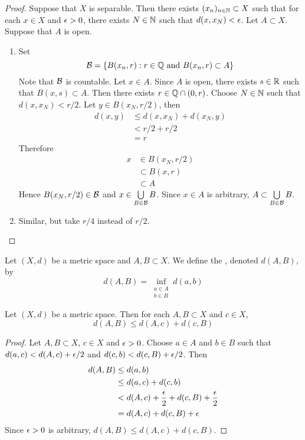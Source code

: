 \documentclass{book}
\begin{document}
\begin{proof}
	Suppose that $X$ is separable. Then there exists $(x_n)_{n \in \mathbb{N}} \subset X$ such that for each $x \in X$ and $\epsilon >0$, there exists $N \in \mathbb{N}$ such that $d(x, x_N) < \epsilon$. Let $A \subset X$. Suppose that $A$ is open.
	\begin{enumerate}
		\item  Set 
		$$\mathcal{B} = \{B(x_n, r): r \in \mathbb{Q} \text{ and } B(x_n, r) \subset A\}$$ 
		Note that $\mathcal{B}$ is countable. Let $x \in A$. Since $A$ is open, there exists $s \in \mathbb{R}$ such that $B(x, s) \subset A$. Then there exists  $r \in \mathbb{Q} \cap (0, r)$. Choose $N \in \mathbb{N}$ such that $d(x, x_N) < r/2$. Let $y \in B(x_N, r/2)$, then 
		\begin{align*}
			d(x, y) 
			& \leq d(x, x_N) + d(x_N, y) \\
			& < r/2 + r/2 \\
			& = r
		\end{align*}
		Therefore 
		\begin{align*}
			x 
			& \in B(x_N, r/2) \\
			& \subset B(x, r) \\
			& \subset A
		\end{align*}
		Hence $B(x_N, r/2) \in \mathcal{B}$ and $x \in \bigcup\limits_{B \in \mathcal{B}}B$. Since $x \in A$ is arbitrary, $A \subset \bigcup\limits_{B \in \mathcal{B}}B$.
		\item Similar, but take $r/4$ instead of $r/2$.
	\end{enumerate}
\end{proof}

\begin{defn} \ld{}
	Let $(X,d)$ be a metric space and $A,B \subset X$. We define the , denoted $d(A,B)$, by $$d(A,B) = \inf_{\substack{a \in A \\ b \in B}} d(a,b)$$
\end{defn}

\begin{ex} \lex{}
	Let $(X,d)$ be a metric space. Then for each $A,B \subset X$ and $c \in X$, $$d(A,B) \leq d(A,c) + d(c, B)$$
\end{ex}

\begin{proof}
	Let $A,B \subset X$, $c \in X$ and $\epsilon>0$. Choose $a \in A$ and $b \in B$ such that $d(a,c) < d(A,c)+ \epsilon/2$ and  $d(c,b) < d(c,B)+ \epsilon/2$. Then 
	\begin{align*}
		d(A,B) 
		&\leq d(a,b) \\
		&\leq d(a,c) + d(c,b) \\
		&< d(A,c) + \frac{\epsilon}{2} + d(c,B) + \frac{\epsilon}{2} \\
		&= d(A,c) + d(c,B) + \epsilon
	\end{align*}
	Since $\epsilon >0$ is arbitrary, $d(A,B) \leq d(A,c) + d(c,B)$.
\end{proof}
\end{document}
